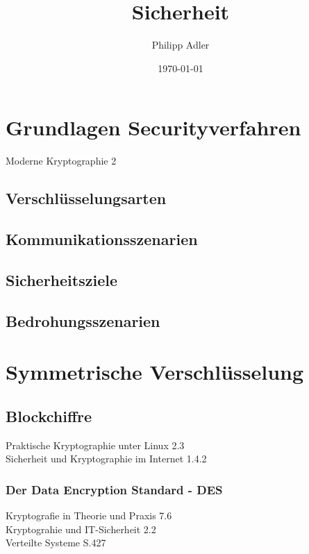 \documentclass[11pt]{scrartcl}
\title{Sicherheit}
\author{Philipp Adler}
\date{\today{}}
\begin{document}
\maketitle
\tableofcontents
\pagebreak

\section{Grundlagen Securityverfahren}
\label{sec:basics-security-process}
Moderne Kryptographie 2

\subsection{Verschlüsselungsarten}
\label{sec:ciphering types}

\subsection{Kommunikationsszenarien}
\label{sec:communication-scenarios}

\subsection{Sicherheitsziele}
\label{sec:security goals}

\subsection{Bedrohungsszenarien}
\label{sec:threat scenarios}


\section{Symmetrische Verschlüsselung}
\label{sec:symetric-ciphering}

\subsection{Blockchiffre}
\label{sec:blockchiffre}
Praktische Kryptographie unter Linux 2.3\\
Sicherheit und Kryptographie im Internet 1.4.2

\subsubsection{Der Data Encryption Standard - DES}
\label{sec:data-encryotion-standard}
Kryptografie in Theorie und Praxis 7.6\\
Kryptograhie und IT-Sicherheit 2.2\\
Verteilte Systeme S.427
\end{document}
